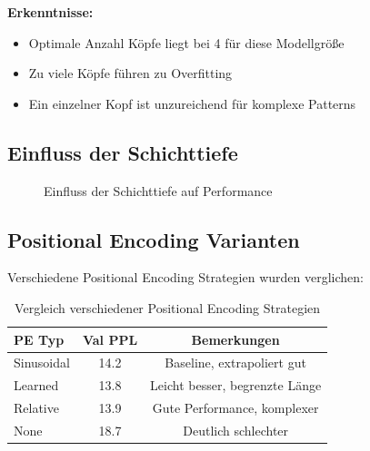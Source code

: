 \textbf{Erkenntnisse:}
\begin{itemize}
    \item Optimale Anzahl Köpfe liegt bei 4 für diese Modellgröße
    \item Zu viele Köpfe führen zu Overfitting
    \item Ein einzelner Kopf ist unzureichend für komplexe Patterns
\end{itemize}

\subsection{Einfluss der Schichttiefe}

\begin{figure}[h]
\centering
{}
\caption{Einfluss der Schichttiefe auf Performance}
\label{fig:depth_ablation}
\end{figure}

\subsection{Positional Encoding Varianten}

Verschiedene Positional Encoding Strategien wurden verglichen:

\begin{table}[h]
\centering
\begin{tabular}{|l|c|c|}
\hline
\textbf{PE Typ} & \textbf{Val PPL} & \textbf{Bemerkungen} \\
\hline
Sinusoidal & 14.2 & Baseline, extrapoliert gut \\
Learned & 13.8 & Leicht besser, begrenzte Länge \\
Relative & 13.9 & Gute Performance, komplexer \\
None & 18.7 & Deutlich schlechter \\
\hline
\end{tabular}
\caption{Vergleich verschiedener Positional Encoding Strategien}
\label{tab:positional_encoding_comparison}
\end{table}

